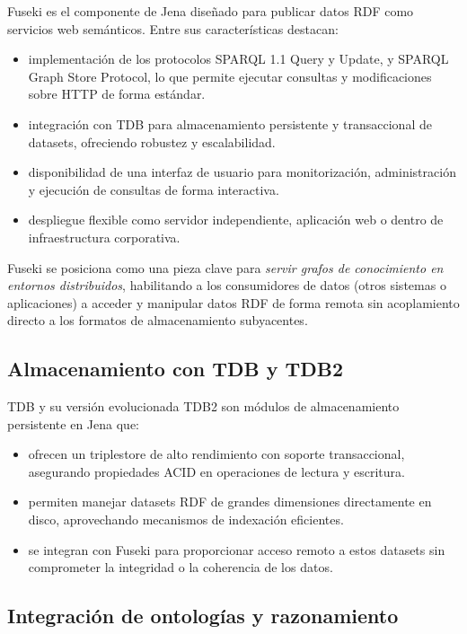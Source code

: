 \documentclass{article}
\begin{document}
Fuseki es el componente de Jena diseñado para publicar datos RDF como servicios web semánticos. Entre sus características destacan:

\begin{itemize}
    \item implementación de los protocolos SPARQL 1.1 Query y Update, y SPARQL Graph Store Protocol, lo que permite ejecutar consultas y modificaciones sobre HTTP de forma estándar. 

    \item integración con TDB para almacenamiento persistente y transaccional de datasets, ofreciendo robustez y escalabilidad. 
    \item disponibilidad de una interfaz de usuario para monitorización, administración y ejecución de consultas de forma interactiva.

    \item despliegue flexible como servidor independiente, aplicación web o dentro de infraestructura corporativa.
\end{itemize}

Fuseki se posiciona como una pieza clave para \textit{servir grafos de conocimiento en entornos distribuidos}, habilitando a los consumidores de datos (otros sistemas o aplicaciones) a acceder y manipular datos RDF de forma remota sin acoplamiento directo a los formatos de almacenamiento subyacentes.
\subsection{Almacenamiento con TDB y TDB2}

TDB y su versión evolucionada TDB2 son módulos de almacenamiento persistente en Jena que:

\begin{itemize}
    \item ofrecen un triplestore de alto rendimiento con soporte transaccional, asegurando propiedades ACID en operaciones de lectura y escritura.

    \item permiten manejar datasets RDF de grandes dimensiones directamente en disco, aprovechando mecanismos de indexación eficientes.

    \item se integran con Fuseki para proporcionar acceso remoto a estos datasets sin comprometer la integridad o la coherencia de los datos. 
\end{itemize}

\subsection{Integración de ontologías y razonamiento}
\end{document}
